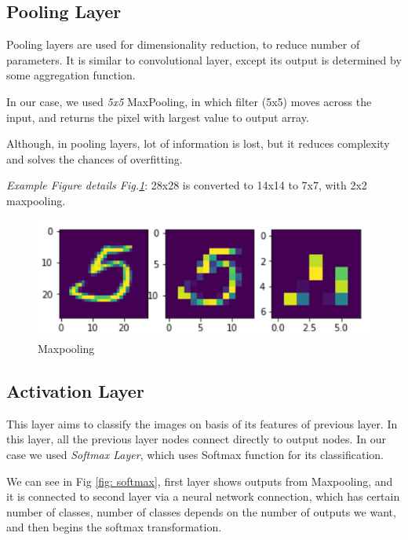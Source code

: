 \documentclass[conference]{IEEEtran}
\begin{document}
\subsection{Pooling Layer}
Pooling layers are used for dimensionality reduction, to reduce number of parameters. It is similar to convolutional layer, except its output is determined by some aggregation function.

In our case, we used \emph{5x5} MaxPooling, in which filter (5x5) moves across the input, and returns the pixel with largest value to output array.

Although, in pooling layers, lot of information is lost, but it reduces complexity and solves the chances of overfitting.

\emph{Example Figure details Fig.\ref{fig: maxpool}}: 28x28 is converted to 14x14 to 7x7, with 2x2 maxpooling.
\begin{figure}[h]
  \centering
  \includegraphics[scale=0.4]{images/maxpool.png}
  \caption{Maxpooling\cite{MNIST}}
  \label{fig: maxpool}
\end{figure}

\subsection{Activation Layer}

This layer aims to classify the images on basis of its features of previous layer. In this layer, all the previous layer nodes connect directly to output nodes. In our case we used \emph{Softmax Layer}\cite{CNN_Keras_VZ_SM_2019}, which uses Softmax function for its classification.

We can see in Fig \ref{fig: softmax}, first layer shows outputs from Maxpooling, and it is connected to second layer via a neural network connection, which has certain number of classes, number of classes depends on the number of outputs we want, and then begins the softmax transformation.
\end{document}
